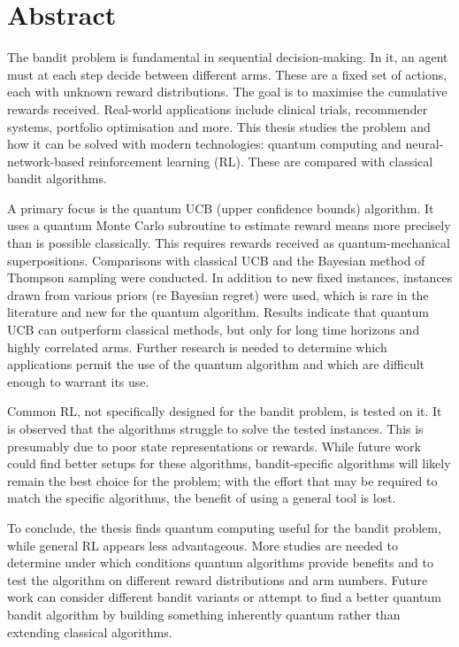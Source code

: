 \chapter{Abstract}
The bandit problem is fundamental in sequential decision-making.
In it, an agent must at each step decide between different arms.
These are a fixed set of actions, each with unknown reward distributions.
The goal is to maximise the cumulative rewards received.
Real-world applications include clinical trials, recommender systems, portfolio optimisation and more.
This thesis studies the problem and how it can be solved with modern technologies: quantum computing and neural-network-based reinforcement learning (RL).
These are compared with classical bandit algorithms.

A primary focus is the quantum UCB (upper confidence bounds) algorithm.
It uses a quantum Monte Carlo subroutine to estimate reward means more precisely than is possible classically.
This requires rewards received as quantum-mechanical superpositions.
Comparisons with classical UCB and the Bayesian method of Thompson sampling were conducted.
In addition to new fixed instances, instances drawn from various priors (re Bayesian regret) were used, which is rare in the literature and new for the quantum algorithm.
Results indicate that quantum UCB can outperform classical methods, but only for long time horizons and highly correlated arms.
Further research is needed to determine which applications permit the use of the quantum algorithm and which are difficult enough to warrant its use.

Common RL, not specifically designed for the bandit problem, is tested on it.
It is observed that the algorithms struggle to solve the tested instances.
This is presumably due to poor state representations or rewards.
While future work could find better setups for these algorithms, bandit-specific algorithms will likely remain the best choice for the problem; with the effort that may be required to match the specific algorithms, the benefit of using a general tool is lost.

To conclude, the thesis finds quantum computing useful for the bandit problem, while general RL appears less advantageous.
More studies are needed to determine under which conditions quantum algorithms provide benefits and to test the algorithm on different reward distributions and arm numbers.
Future work can consider different bandit variants or attempt to find a better quantum bandit algorithm by building something inherently quantum rather than extending classical algorithms.



\cleardoublepage